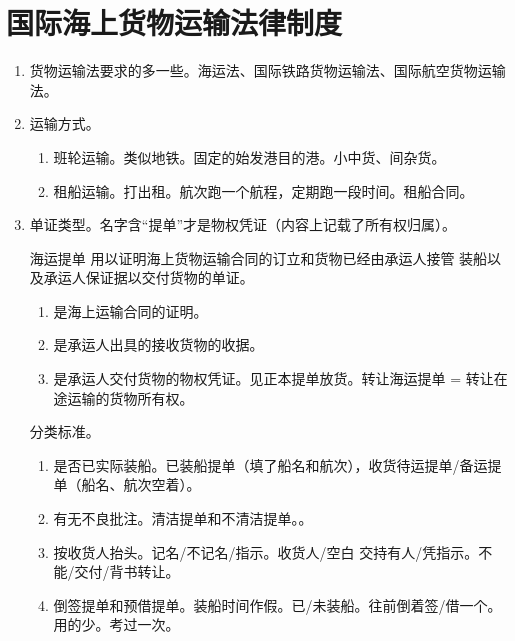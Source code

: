 \section{国际海上货物运输法律制度}
\begin{enumerate}
  \item 货物运输法要求的多一些。海运法、国际铁路货物运输法、国际航空货物运输法。
  \item 运输方式。
        \begin{enumerate}
          \item 班轮运输。类似地铁。固定的始发港目的港。小中货、间杂货。
          \item 租船运输。打出租。航次跑一个航程，定期跑一段时间。租船合同。
        \end{enumerate}
  \item 单证类型。名字含“提单”才是物权凭证（内容上记载了所有权归属）。
        \begin{kk}{海运提单}
          用以证明海上货物运输合同的订立和货物已经由承运人接管 \hz 装船以及承运人保证据以交付货物的单证。
          \begin{enumerate}
            \item 是海上运输合同的证明。
            \item 是承运人出具的接收货物的收据。
            \item 是承运人交付货物的物权凭证。见正本提单放货。转让海运提单 = 转让在途运输的货物所有权。
          \end{enumerate}
          \tcblower
          分类标准。
          \begin{enumerate}
            \item 是否已实际装船。已装船提单（填了船名和航次），收货待运提单/备运提单（船名、航次空着）。
            \item 有无不良批注。清洁提单和不清洁提单。。
            \item 按收货人抬头。记名/不记名/指示。收货人/空白 \hz 交持有人/凭指示。不能/交付/背书转让。
            \item 倒签提单和预借提单。装船时间作假。已/未装船。往前倒着签/借一个。用的少。考过一次。
          \end{enumerate}
        \end{kk}


\end{enumerate}
